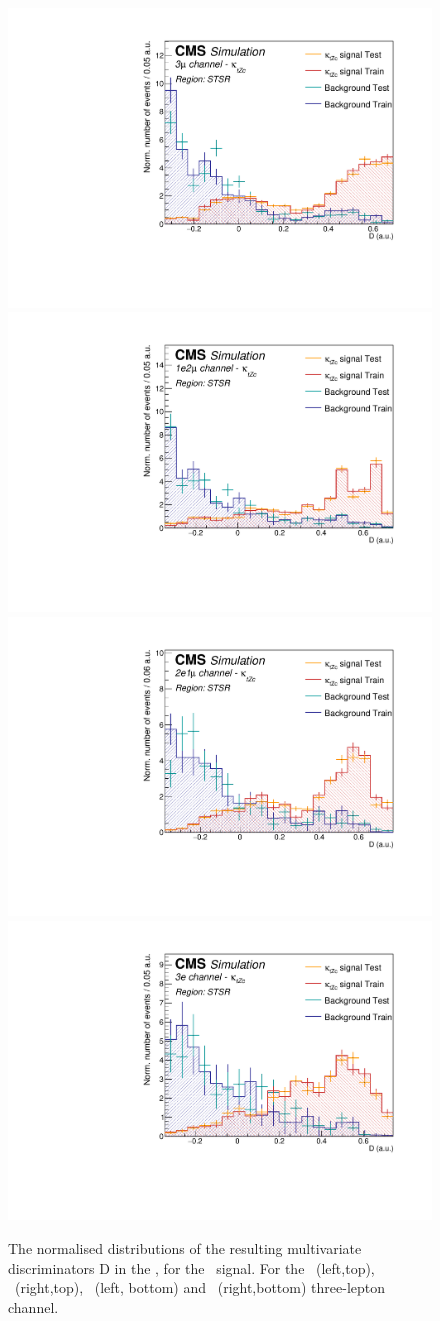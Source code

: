 \clearpage


\begin{figure}[htbp]
	\centering
	\includegraphics[width=0.49\linewidth]{6_Search/Figures/PlotsTechnics/SigVsBkgTestZctsingletopuuu}
	\includegraphics[width=0.49\linewidth]{6_Search/Figures/PlotsTechnics/SigVsBkgTestZctsingletopuue}
	\includegraphics[width=0.49\linewidth]{6_Search/Figures/PlotsTechnics/SigVsBkgTestZctsingletopeeu}
	\includegraphics[width=0.49\linewidth]{6_Search/Figures/PlotsTechnics/SigVsBkgTestZctsingletopeee}
	\caption{The normalised distributions of the resulting  multivariate discriminators D in the \STSR, for the \Zct\ signal. For the \mumumu\ (left,top), \emumu\ (right,top), \eemu\ (left, bottom) and \eee\ (right,bottom) three-lepton channel.}
	\label{fig:sigvsbkgtestzctsingletop}
\end{figure}




